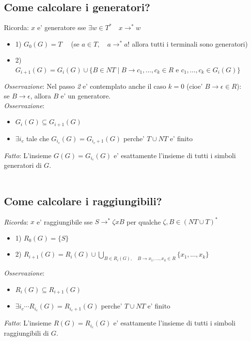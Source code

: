 \documentclass[a4paper,12pt]{article}
\begin{document}
{\subsection{Come calcolare i generatori?}
Ricorda: $x$ e' generatore sse $\exists w \in T^* \quad x \to^* w$
\begin{itemize}
  \item 1) $G_0(G) = T\quad $ (se $a \in T, \quad a \to^* a$! allora tutti i terminali sono generatori)
  \item 2) $G_{i+1}(G) = G_i(G) \cup \{B \in NT \mid B \to c_1, \dots, c_k \in R \text{ e } c_1, \dots, c_k \in G_i(G)\}$
\end{itemize}
\textit{Osservazione}: Nel passo \textit{2} e' contemplato anche il caso $k=0$ (cioe' $B \to \epsilon \in R$): se $B \to \epsilon$, allora $B$ e' un generatore. \\
\textit{Osservazione}: 
\begin{itemize}
  \item $G_i(G) \subseteq G_{i+1}(G)$
  \item $\exists i_c$ tale che $G_{i_c}(G) = G_{i_c + 1}(G)$ perche' $T \cup NT$ e' finito
\end{itemize}
\textit{Fatto}: L'insieme $G(G) = G_{i_c}(G)$ e' esattamente l'insieme di tutti i simboli generatori di $G$. \\
\vspace{1em} \\
\subsection{Come calcolare i raggiungibili?}
\textit{Ricorda}: $x$ e' raggiungibile sse $S \to^* \zeta xB$ per qualche $\zeta, B \in (NT \cup T)^*$
\begin{itemize}
  \item 1) $R_0(G)=\{S\}$
  \item 2) $R_{i+1}(G)=R_i(G) \cup \bigcup_{B \in R_i(G),\quad  B \to x_1, \dots, x_k \in R}\{x_1, \dots, x_k\}$
\end{itemize} 
\textit{Osservazione}: 
\begin{itemize}
  \item $R_i (G) \subseteq R_{i+1}(G)$
  \item $\exists i_c \cdots R_{i_c}(G) = R_{i_c +1}(G)$ perche' $T \cup NT$ e' finito
\end{itemize}
\textit{Fatto}: L'insieme $R(G) = R_{i_c}(G)$ e' esattamente l'insieme di tutti i simboli raggiungibili di $G$. \\
\vspace{1em} \\
}
\end{document}

